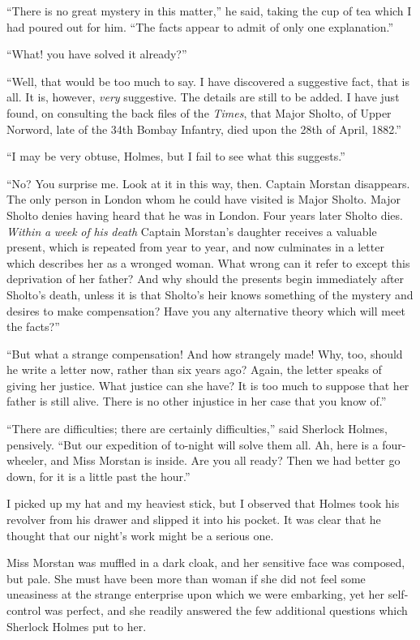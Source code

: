 \documentclass[12pt,english,oneside]{book}
\begin{document}
{}``There is no great mystery in this matter,'' he said, taking
the cup of tea which I had poured out for him. {}``The facts appear
to admit of only one explanation.''

{}``What! you have solved it already?''

{}``Well, that would be too much to say. I have discovered a suggestive
fact, that is all. It is, however, \textit{very} suggestive. The details
are still to be added. I have just found, on consulting the back files
of the \emph{Times}, that Major Sholto, of Upper Norword, late of
the 34th Bombay Infantry, died upon the 28th of April, 1882.''

{}``I may be very obtuse, Holmes, but I fail to see what this suggests.''

{}``No? You surprise me. Look at it in this way, then. Captain Morstan
disappears. The only person in London whom he could have visited is
Major Sholto. Major Sholto denies having heard that he was in London.
Four years later Sholto dies. \textit{Within} \emph{a} \textit{week}
\textit{of} \textit{his} \textit{death} Captain Morstan's daughter
receives a valuable present, which is repeated from year to year,
and now culminates in a letter which describes her as a wronged woman.
What wrong can it refer to except this deprivation of her father?
And why should the presents begin immediately after Sholto's death,
unless it is that Sholto's heir knows something of the mystery and
desires to make compensation? Have you any alternative theory which
will meet the facts?''

{}``But what a strange compensation! And how strangely made! Why,
too, should he write a letter now, rather than six years ago? Again,
the letter speaks of giving her justice. What justice can she have?
It is too much to suppose that her father is still alive. There is
no other injustice in her case that you know of.''

{}``There are difficulties; there are certainly difficulties,''
said Sherlock Holmes, pensively. {}``But our expedition of to-night
will solve them all. Ah, here is a four-wheeler, and Miss Morstan
is inside. Are you all ready? Then we had better go down, for it is
a little past the hour.''

I picked up my hat and my heaviest stick, but I observed that Holmes
took his revolver from his drawer and slipped it into his pocket.
It was clear that he thought that our night's work might be a serious
one.

Miss Morstan was muffled in a dark cloak, and her sensitive face was
composed, but pale. She must have been more than woman if she did
not feel some uneasiness at the strange enterprise upon which we were
embarking, yet her self-control was perfect, and she readily answered
the few additional questions which Sherlock Holmes put to her.
\end{document}
